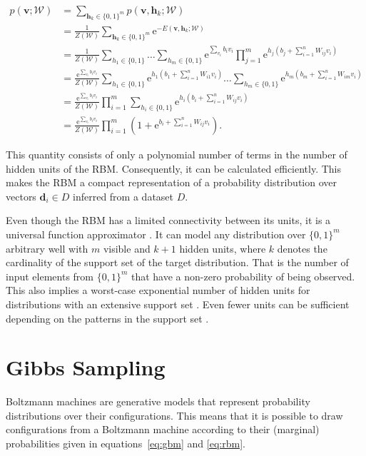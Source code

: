\begin{align}
   p(\bm{v};\mathcal{W}) &= \sum_{\bm{h}_k \in \{0,1\}^m} p(\bm{v},\bm{h}_k;\mathcal{W})\\
   &= \frac{1}{Z(\mathcal{W})}\sum_{\bm{h}_k \in \{0,1\}^m} \mathrm{e}^{-E(\bm{v}, \bm{h}_k;\mathcal{W})}\\
   &= \frac{1}{Z(\mathcal{W})}\sum_{h_1\in \{0,1\}}\dots\sum_{h_m \in \{0,1\}}\mathrm{e}^{\sum_{v_i}b_iv_i}\prod_{j=1}^m\mathrm{e}^{h_j(b_j + \sum_{i=1}^nW_{ij}v_i)}\\
   &= \frac{\mathrm{e}^{\sum_{v_i}b_iv_i}}{Z(\mathcal{W})}\sum_{h_1 \in \{0,1\}}\mathrm{e}^{h_1(b_1 + \sum_{i=1}^nW_{i1}v_i)}\dots\sum_{h_m \in \{0,1\}}\mathrm{e}^{h_m(b_m + \sum_{i=1}^nW_{im}v_i)}\\
   &= \frac{\mathrm{e}^{\sum_{v_i}b_iv_i}}{Z(\mathcal{W})}\prod_{i=1}^m\sum_{h_i \in \{0,1\}}\mathrm{e}^{h_i(b_i + \sum_{i=1}^nW_{ij}v_i)}\\
   \label{eq:rbm}
   &= \frac{\mathrm{e}^{\sum_{v_i}b_iv_i}}{Z(\mathcal{W})}\prod_{i=1}^m(1+\mathrm{e}^{b_i + \sum_{i=1}^nW_{ij}v_i}).
\end{align}

This quantity consists of only a polynomial number of terms in the number of hidden units of the RBM. Consequently, it can be calculated efficiently. This makes the RBM a compact representation of a probability distribution over vectors $\bm{d}_i \in D$ inferred from a dataset $D$.

Even though the RBM has a limited connectivity between its units, it is a universal function approximator \cite{le2008representational}.
It can model any distribution over $\{0,1\}^m$ arbitrary well with $m$ visible and $k+1$ hidden units, where 
$k$ denotes the cardinality of the support set of the target distribution. That is the number of input elements
from $\{0,1\}^m$ that have a non-zero probability of being observed. This also implies a worst-case 
exponential number of hidden units for distributions with an extensive support set \cite{le2008representational}. Even fewer units can be sufficient depending on the patterns in the support set \cite{montufar2011refinements}.

\section{Gibbs Sampling}
\label{sec:gibbsSampling}

Boltzmann machines are generative models that represent probability distributions over their configurations. This means that it is possible to draw configurations from a Boltzmann machine
according to their (marginal) probabilities given in equations~\ref{eq:gbm} and \ref{eq:rbm}.


